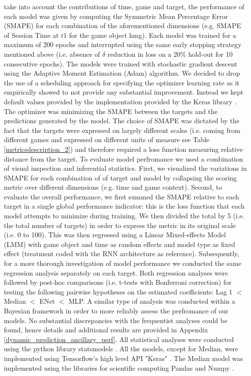 take into account the contributions of time, game and target, the performance of each model was given by computing the Symmetric Mean Percentage Error (SMAPE) \cite{zhu2017deep} for each combination of the aforementioned dimensions (e.g. SMAPE of Session Time at $t1$ for the game object hmg). Each model was trained for a maximum of 200 epochs and interrupted using the same early stopping strategy mentioned above (i.e. absence of $\delta$ reduction in loss on a 20\% hold-out for 10 consecutive epochs). The models were trained with stochastic gradient descent using the Adaptive Moment Estimation (Adam) \cite{kingma2014adam} algorithm. We decided to drop the use of a scheduling approach for specifying the optimizer learning rate as it empirically showed to not provide any substantial improvement. Instead we kept default values provided by the implementation provided by the Keras library \cite{chollet2015keras}. The optimizer was minimizing the SMAPE between the targets and the predictions generated by the model. The choice of SMAPE was dictated by the fact that the targets were expressed on largely different scales (i.e. coming from different games and expressed on different units of measure see Table \ref{metricsdescription_2}) and therefore required a loss function measuring relative distance from the target. To evaluate model perfromance we used a combination of visual inspection and inferential statistics. First, we visualized the variations in SMAPE for each combination of of target and model by collapsing the scoring metric over different dimensions (e.g. time and game context). Second, to evaluate the overall performance, we first summed the SMAPE relative to each target in a single global performance indicator: this is the loss function that each model attempts to minimize during training. We then divided the total by 5 (i.e. the total number of targets) in order to express the metric in its original scale (i.e. 0 to 100). This was then regressed using a Linear Mixed-effects Model (LMM) with game object and time as random effects and model type as fixed effect (treatment coded with the RNN architecture as reference). Subsequently, for a more thorough investigation of model performance we conducted the same regression analysis separately on each target. Both regression analyses were followed by post-hoc comparisons (i.e. t-tests with Bonferroni correction) for testing the following pairwise hypotheses on the estimated coefficients: Lag 1 $<$ Median $<$ ENet $<$ MLP. A similar type of analysis was conducted within a Bayesian framework in order to more reliably assess the perfromance of our models. No substantial discrepancies with the frequentist analyses could be found, hence details and additional results are provided in Appendix \ref{dynamic_prediction_ancillary_perf}. All statistical analyses were conducted using the python library statsmodels \cite{seabold2010statsmodels}.  All the models, except for Median, were implemented using Tensorflow's high level API "Keras" \cite{tensorflow2015-whitepaper,chollet2015keras}. The Median model was implemented using the libraries for scientific computing Pandas and Numpy \cite{reback2020pandas,harris2020array}.

